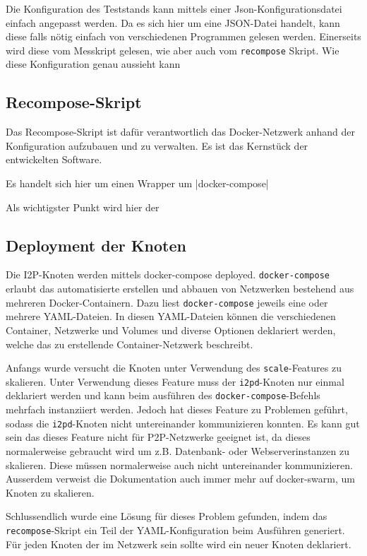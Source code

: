 Die Konfiguration des Teststands kann mittels einer Json-Konfigurationsdatei einfach angepasst werden.
Da es sich hier um eine JSON-Datei handelt, kann diese falls nötig einfach von verschiedenen Programmen gelesen werden.
Einerseits wird diese vom Messkript gelesen, wie aber auch vom \lstinline|recompose| Skript.
Wie diese Konfiguration genau aussieht kann


\subsection{Recompose-Skript}

Das Recompose-Skript ist dafür verantwortlich das Docker-Netzwerk anhand der Konfiguration aufzubauen und zu verwalten.
Es ist das Kernstück der entwickelten Software.

Es handelt sich hier um einen Wrapper um \lstinlline|docker-compose|

Als wichtigster Punkt wird hier der 

\subsection{Deployment der Knoten}

Die I2P-Knoten werden mittels docker-compose deployed.
\lstinline|docker-compose| erlaubt das automatisierte erstellen und abbauen von Netzwerken bestehend aus mehreren Docker-Containern.
Dazu liest \lstinline|docker-compose| jeweils eine oder mehrere YAML-Dateien.
In diesen YAML-Dateien können die verschiedenen Container, Netzwerke und Volumes und diverse Optionen deklariert werden, welche das zu erstellende Container-Netzwerk beschreibt.

Anfangs wurde versucht die Knoten unter Verwendung des \lstinline|scale|-Features zu skalieren.
Unter Verwendung dieses Feature muss der \lstinline|i2pd|-Knoten nur einmal deklariert werden und kann beim ausführen des \lstinline|docker-compose|-Befehls mehrfach instanziiert werden.
Jedoch hat dieses Feature zu Problemen geführt, sodass die \lstinline|i2pd|-Knoten nicht untereinander kommunizieren konnten.
Es kann gut sein das dieses Feature nicht für P2P-Netzwerke geeignet ist, da dieses normalerweise gebraucht wird um z.B. Datenbank- oder Webserverinstanzen zu skalieren.
Diese müssen normalerweise auch nicht untereinander kommunizieren.
Ausserdem verweist die Dokumentation auch immer mehr auf docker-swarm, um Knoten zu skalieren.

Schlussendlich wurde eine Lösung für dieses Problem gefunden,
indem das \lstinline|recompose|-Skript ein Teil der YAML-Konfiguration beim Ausführen generiert.
Für jeden Knoten der im Netzwerk sein sollte wird ein neuer Knoten deklariert.

